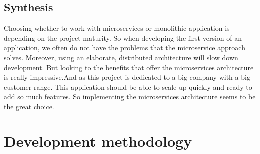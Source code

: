 \subsection{Synthesis}
\label{subsec:subsec01}
Choosing whether to work with microservices or monolithic application is depending on the project maturity. So when developing the first
 version of an application, we often do not have the problems that the microservice approach solves. 
 Moreover, using an elaborate, distributed architecture will slow down development. But looking to the benefits that offer the microservices architecture is
 really impressive.And as this project is dedicated to a big company with a big customer range. This application should be able to scale up quickly and
 ready to add so much features. So implementing the microservices architecture seems to be the great choice.


\section{Development methodology}
\label{subsec:subsec01}

